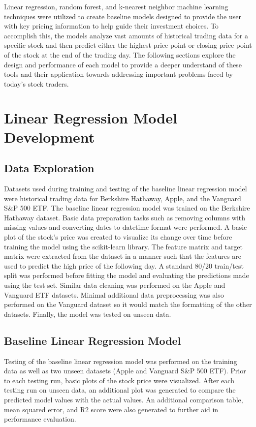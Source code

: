 \documentclass[conference]{IEEEtran}
\begin{document}
Linear regression, random forest, and k-nearest neighbor machine learning techniques were utilized to create baseline models designed to provide the user with key pricing information to help guide their investment choices. To accomplish this, the models analyze vast amounts of historical trading data for a specific stock and then predict either the highest price point or closing price point of the stock at the end of the trading day.  The following sections explore the design and performance of each model to provide a deeper understand of these tools and their application towards addressing important problems faced by today's stock traders.

\section{Linear Regression Model Development}

\subsection{Data Exploration}
Datasets used during training and testing of the baseline linear regression model were historical trading data for Berkshire Hathaway, Apple, and the Vanguard S\&P 500 ETF. The baseline linear regression model was trained on the Berkshire Hathaway dataset. Basic data preparation tasks such as removing columns with missing values and converting dates to datetime format were performed. A basic plot of the stock's price was created to visualize its change over time before training the model using the scikit-learn library. The feature matrix and target matrix were extracted from the dataset in a manner such that the features are used to predict the high price of the following day. A standard 80/20 train/test split was performed before fitting the model and evaluating the predictions made using the test set. Similar data cleaning was performed on the Apple and Vanguard ETF datasets. Minimal additional data preprocessing was also performed on the Vanguard dataset so it would match the formatting of the other datasets. Finally, the model was tested on unseen data.

\subsection{Baseline Linear Regression Model}
Testing of the baseline linear regression model was performed on the training data as well as two unseen datasets (Apple and Vanguard S\&P 500 ETF). Prior to each testing run, basic plots of the stock price were visualized. After each testing run on unseen data, an additional plot was generated to compare the predicted model values with the actual values. An additional comparison table, mean squared error, and R2 score were also generated to further aid in performance evaluation.
\end{document}
